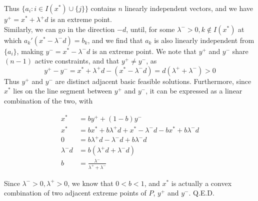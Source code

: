 \documentclass[11pt]{article}
\begin{document}
Thus $\{a_i: i\in I(x^*)\cup\{j\}\}$ contains $n$ linearly independent vectors, and we have $y^+=x^*+\lambda^+ d$ is an extreme point.\\

Similarly, we can go in the direction $-d$, until, for some $\lambda^-> 0, k\notin I(x^*)$ at which $a_k'(x^*-\lambda^-d)=b_k$, and we find that $a_k$ is also linearly independent from $\{a_i\}$, making  $y^-=x^*-\lambda^- d$ is an extreme point. We note that $y^+$ and $y^-$ share $(n-1)$ active constraints, and that $y^+\neq y^-$, as
$$
y^+-y^-=x^*+\lambda^+ d - (x^*-\lambda^- d) = d(\lambda^++\lambda^-)>0
$$
Thus $y^+$ and $y^-$ are distinct adjacent basic feasible solutions. Furthermore, since $x^*$ lies on the line segment between $y^+$ and $y^-$, it can be expressed as a linear combination of the two, with

\begin{equation}
\begin{split}
x^* &= by^+ + (1-b)y^-\\
x^* &= bx^* + b\lambda^+d + x^* - \lambda^-d - bx^* + b\lambda^-d\\
0 &= b\lambda^+d - \lambda^-d + b\lambda^-d\\
\lambda^-d &= b(\lambda^+d+\lambda^-d)\\
b&=\frac{\lambda^-}{\lambda^+ + \lambda^-}
\end{split}
\end{equation}

Since $\lambda^->0, \lambda^+>0$, we know that $0<b<1$, and $x^*$ is actually a convex combination of two adjacent extreme points of $P$, $y^+$ and $y^-$. Q.E.D.
\end{document}
